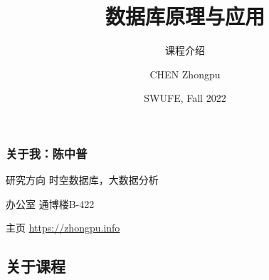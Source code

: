 \documentclass[aspectratio=169, 14pt]{beamer}
\title[Database Principles and Applications] %
{数据库原理与应用}
\subtitle{课程介绍}
\author[CHEN Zhongpu] %
{CHEN Zhongpu}
\institute[] %
{
  School of Computing and Artificial Intelligence \\
  \href{mailto:zpchen@swufe.edu.cn}{zpchen@swufe.edu.cn}
}
\date[] %
{SWUFE, Fall 2022}
\begin{document}
\frame{\titlepage}

\begin{frame}
    \frametitle{关于我：陈中普}
    
    \begin{block}{ 研究方向}
        时空数据库，大数据分析
    \end{block}
    
    \begin{block}{ 办公室}
        通博楼B-422
    \end{block}
    
    \begin{block}{ 主页}
        \href{https://zhongpu.info}{https://zhongpu.info}
    \end{block}
    
\end{frame}

{
    \begin{frame}
        \section{\textcolor{darkmidnightblue}{关于课程}}
    \end{frame}
}
\end{document}
